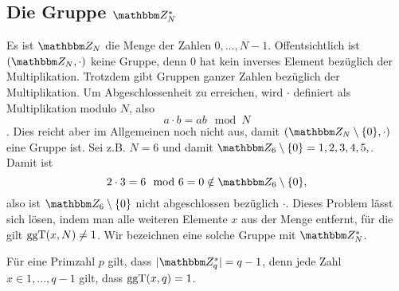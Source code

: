 \subsection{Die Gruppe $\Z{N}^*$}
Es ist $\Z{N}$ die Menge der Zahlen ${0,\dots , N-1}$. Offentsichtlich
ist $(\Z{N}, \cdot)$ keine Gruppe, denn $0$ hat kein inverses Element
bezüglich der Multiplikation.
Trotzdem gibt Gruppen ganzer Zahlen bezüglich der
Multiplikation. Um Abgeschlossenheit zu erreichen, wird $\cdot$
definiert als Multiplikation modulo $N$, also 
\[a \cdot b = ab \mod N\]. Dies reicht aber im Allgemeinen noch nicht
aus, damit $(\Z{N}\setminus \{0\}, \cdot)$ eine Gruppe ist. Sei z.B. $N=6$ und
damit $\Z{6}\setminus \{0\} = {1,2,3,4,5,}$. Damit ist 
\[
2 \cdot 3 = 6 \mod 6 = 0 \notin \Z{6}\setminus \{0\},
\]
also ist $\Z{6}\setminus \{0\}$ nicht abgeschlossen bezüglich $\cdot$. 
Dieses Problem lässt sich lösen, indem man alle weiteren Elemente $x$ aus
der Menge entfernt, für die gilt $\operatorname{ggT}(x, N)\neq 1$. Wir bezeichnen eine
solche Gruppe mit $\Z{N}^*$. 

Für eine Primzahl $p$ gilt, dass  $|\Z{q}^*|= q-1$, denn jede Zahl $x\in
{1,..., q-1}$ gilt, dass $\operatorname{ggT}(x, q)=1$.